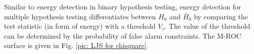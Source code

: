 Similar to energy detection in binary hypothesis testing, energy detection for multiple hypothesis testing differentiates between $H_0$ and $\bar{H}_0$ by comparing the test statistic (in form of energy) with a threshold $V_\tau$. The value of the threshold can be determined by the probability of false alarm constraints.  The M-ROC surface is given in Fig. \ref{pic: LJS for chisquare}. 








